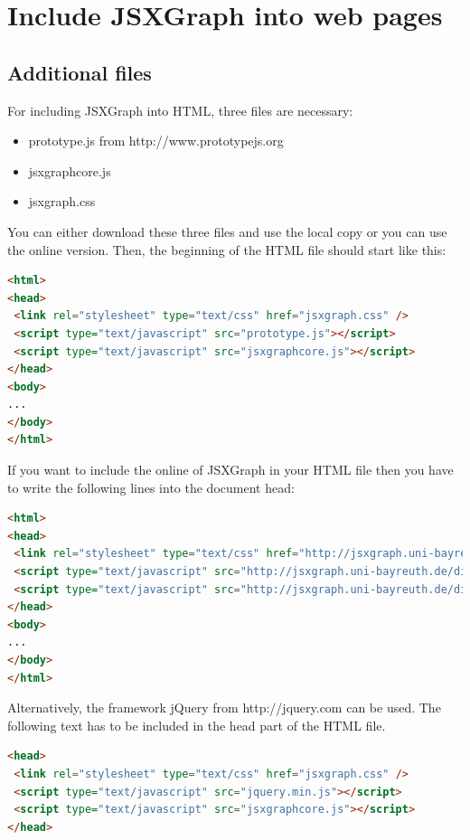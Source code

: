 \documentclass[a4paper]{tufte-book}
\begin{document}
\chapter{Include JSXGraph into web pages}
\label{ch:include}

\section{Additional files}
For including JSXGraph into HTML, three files are necessary:
\begin{itemize}
    \item prototype.js from http://www.prototypejs.org 
    \item jsxgraphcore.js
    \item jsxgraph.css
\end{itemize}
You can either download these three files and use the local copy or you can use the online version.
Then, the beginning of the HTML file should start like this:
\begin{fullwidth}\begin{lstlisting}[language=HTML]
<html>
<head>
 <link rel="stylesheet" type="text/css" href="jsxgraph.css" />
 <script type="text/javascript" src="prototype.js"></script>
 <script type="text/javascript" src="jsxgraphcore.js"></script>
</head>
<body>
...
</body>
</html>
\end{lstlisting}\end{fullwidth}
If you want to include the online of JSXGraph in your HTML file then you have to write the following lines into the document head:
\begin{fullwidth}\begin{lstlisting}[language=HTML]
<html>
<head>
 <link rel="stylesheet" type="text/css" href="http://jsxgraph.uni-bayreuth.de/distrib/jsxgraph.css" />
 <script type="text/javascript" src="http://jsxgraph.uni-bayreuth.de/distrib/prototype.js"></script>
 <script type="text/javascript" src="http://jsxgraph.uni-bayreuth.de/distrib/jsxgraphcore.js"></script>
</head>
<body>
...
</body>
</html>
\end{lstlisting}\end{fullwidth}
Alternatively, the framework jQuery from http://jquery.com can be used.
The following text has to be included in the head part of the HTML file.
\begin{fullwidth}\begin{lstlisting}[language=HTML]
<head>
 <link rel="stylesheet" type="text/css" href="jsxgraph.css" />
 <script type="text/javascript" src="jquery.min.js"></script>
 <script type="text/javascript" src="jsxgraphcore.js"></script>
</head>
\end{lstlisting}\end{fullwidth}
\end{document}
